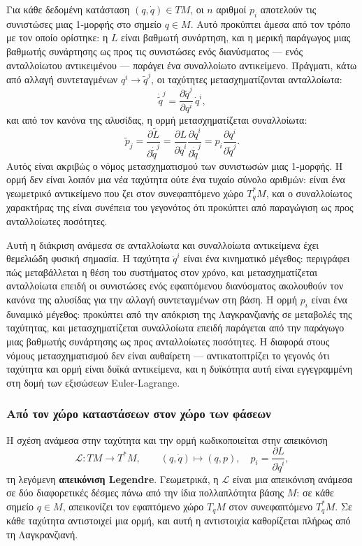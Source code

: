 \documentclass[11pt,a4paper,twoside,openright]{book}
\begin{document}
Για κάθε δεδομένη κατάσταση $(q, \dot{q}) \in TM$, οι $n$ αριθμοί $p_i$ αποτελούν τις συνιστώσες μιας 1-μορφής στο σημείο $q \in M$. Αυτό προκύπτει άμεσα από τον τρόπο με τον οποίο ορίστηκε: η $L$ είναι βαθμωτή συνάρτηση, και η μερική παράγωγος μιας βαθμωτής συνάρτησης ως προς τις συνιστώσες ενός διανύσματος --- ενός ανταλλοίωτου αντικειμένου --- παράγει ένα συναλλοίωτο αντικείμενο. Πράγματι, κάτω από αλλαγή συντεταγμένων $q^i \to \tilde{q}^j$, οι ταχύτητες μετασχηματίζονται ανταλλοίωτα:
\begin{equation}
\dot{\tilde{q}}^j = \frac{\partial \tilde{q}^j}{\partial q^i} \, \dot{q}^i,
\end{equation}
και από τον κανόνα της αλυσίδας, η ορμή μετασχηματίζεται συναλλοίωτα:
\begin{equation}
\tilde{p}_j = \frac{\partial \tilde{L}}{\partial \dot{\tilde{q}}^j} = \frac{\partial L}{\partial \dot{q}^i} \frac{\partial \dot{q}^i}{\partial \dot{\tilde{q}}^j} = p_i \frac{\partial q^i}{\partial \tilde{q}^j}.
\end{equation}
Αυτός είναι ακριβώς ο νόμος μετασχηματισμού των συνιστωσών μιας 1-μορφής. Η ορμή δεν είναι λοιπόν μια νέα ταχύτητα ούτε ένα τυχαίο σύνολο αριθμών: είναι ένα γεωμετρικό αντικείμενο που ζει στον συνεφαπτόμενο χώρο $T_q^*M$, και ο συναλλοίωτος χαρακτήρας της είναι συνέπεια του γεγονότος ότι προκύπτει από παραγώγιση ως προς ανταλλοίωτες ποσότητες.

Αυτή η διάκριση ανάμεσα σε ανταλλοίωτα και συναλλοίωτα αντικείμενα έχει θεμελιώδη φυσική σημασία. Η ταχύτητα $\dot{q}^i$ είναι ένα κινηματικό μέγεθος: περιγράφει πώς μεταβάλλεται η θέση του συστήματος στον χρόνο, και μετασχηματίζεται ανταλλοίωτα επειδή οι συνιστώσες ενός εφαπτόμενου διανύσματος ακολουθούν τον κανόνα της αλυσίδας για την αλλαγή συντεταγμένων στη βάση. Η ορμή $p_i$ είναι ένα δυναμικό μέγεθος: προκύπτει από την απόκριση της Λαγκρανζιανής σε μεταβολές της ταχύτητας, και μετασχηματίζεται συναλλοίωτα επειδή παράγεται από την παράγωγο μιας βαθμωτής συνάρτησης ως προς ανταλλοίωτες ποσότητες. Η διαφορά στους νόμους μετασχηματισμού δεν είναι αυθαίρετη --- αντικατοπτρίζει το γεγονός ότι ταχύτητα και ορμή είναι δυϊκά αντικείμενα, και η δυϊκότητα αυτή είναι εγγεγραμμένη στη δομή των εξισώσεων Euler-Lagrange.

\subsubsection{Από τον χώρο καταστάσεων στον χώρο των φάσεων}

Η σχέση ανάμεσα στην ταχύτητα και την ορμή κωδικοποιείται στην απεικόνιση
\begin{equation}
\mathcal{L}: TM \to T^*M, \qquad (q, \dot{q}) \mapsto (q, p), \quad p_i = \frac{\partial L}{\partial \dot{q}^i},
\end{equation}
τη λεγόμενη \textbf{απεικόνιση Legendre}. Γεωμετρικά, η $\mathcal{L}$ είναι μια απεικόνιση ανάμεσα σε δύο διαφορετικές δέσμες πάνω από την ίδια πολλαπλότητα βάσης $M$: σε κάθε σημείο $q \in M$, απεικονίζει τον εφαπτόμενο χώρο $T_qM$ στον συνεφαπτόμενο $T_q^*M$. Σε κάθε ταχύτητα αντιστοιχεί μια ορμή, και αυτή η αντιστοιχία καθορίζεται πλήρως από τη Λαγκρανζιανή.
\end{document}
